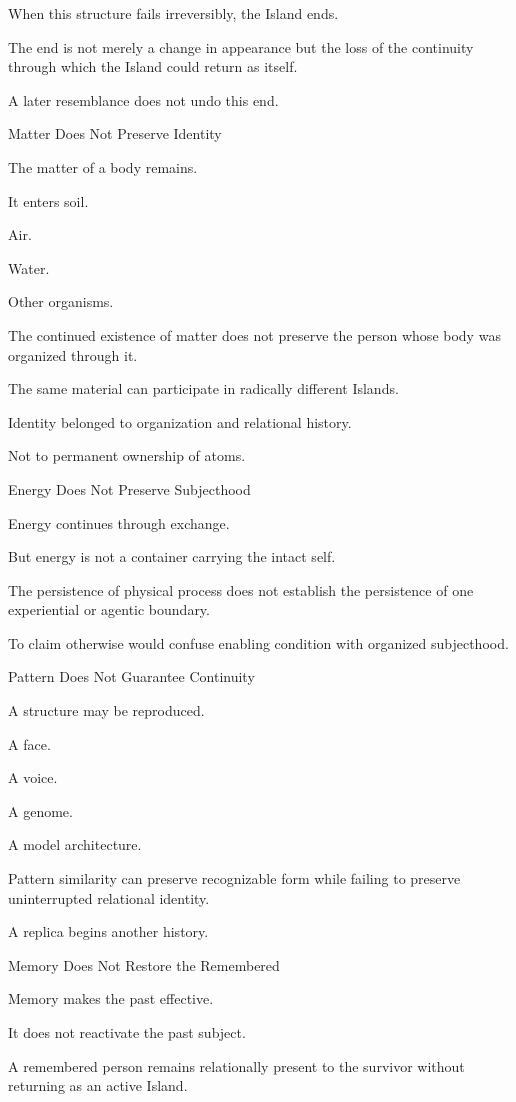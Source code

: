 When this structure fails irreversibly, the Island ends.

The end is not merely a change in appearance but the loss of the continuity through which the Island could return as itself.

A later resemblance does not undo this end.

Matter Does Not Preserve Identity

The matter of a body remains.

It enters soil.

Air.

Water.

Other organisms.

The continued existence of matter does not preserve the person whose body was organized through it.

The same material can participate in radically different Islands.

Identity belonged to organization and relational history.

Not to permanent ownership of atoms.

Energy Does Not Preserve Subjecthood

Energy continues through exchange.

But energy is not a container carrying the intact self.

The persistence of physical process does not establish the persistence of one experiential or agentic boundary.

To claim otherwise would confuse enabling condition with organized subjecthood.

Pattern Does Not Guarantee Continuity

A structure may be reproduced.

A face.

A voice.

A genome.

A model architecture.

Pattern similarity can preserve recognizable form while failing to preserve uninterrupted relational identity.

A replica begins another history.

Memory Does Not Restore the Remembered

Memory makes the past effective.

It does not reactivate the past subject.

A remembered person remains relationally present to the survivor without returning as an active Island.


